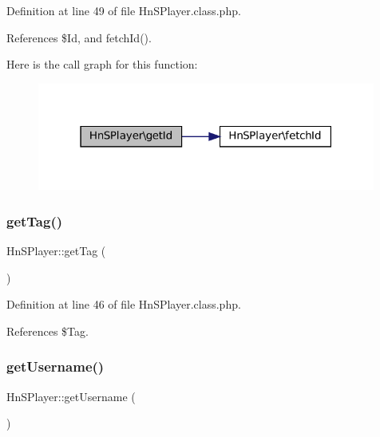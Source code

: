 Definition at line 49 of file Hn\+S\+Player.\+class.\+php.



References \$\+Id, and fetch\+Id().

Here is the call graph for this function\+:\nopagebreak
\begin{figure}[H]
\begin{center}
\leavevmode
\includegraphics[width=315pt]{class_hn_s_player_ad3a3fcc2b75f6814fe25ad07f1c71b52_cgraph}
\end{center}
\end{figure}
\mbox{\label{class_hn_s_player_abc9a4f5e997c72d3051fa6ef54840e1d}} 
\subsubsection{\texorpdfstring{get\+Tag()}{getTag()}}
{\footnotesize\ttfamily Hn\+S\+Player\+::get\+Tag (\begin{DoxyParamCaption}{ }\end{DoxyParamCaption})}



Definition at line 46 of file Hn\+S\+Player.\+class.\+php.



References \$\+Tag.

\mbox{\label{class_hn_s_player_adb4543ae99d1d2d7e9cad39e5079bdfc}} 
\subsubsection{\texorpdfstring{get\+Username()}{getUsername()}}
{\footnotesize\ttfamily Hn\+S\+Player\+::get\+Username (\begin{DoxyParamCaption}{ }\end{DoxyParamCaption})}



